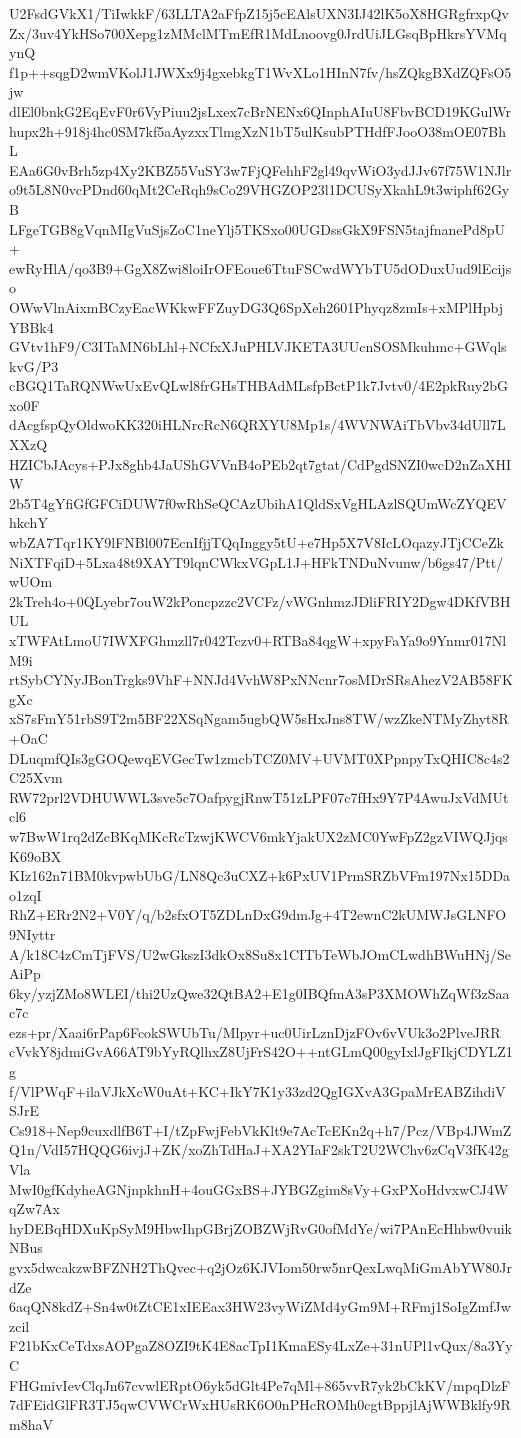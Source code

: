 U2FsdGVkX1/TiIwkkF/63LLTA2aFfpZ15j5cEAlsUXN3IJ42lK5oX8HGRgfrxpQv
Zx/3uv4YkHSo700Xepg1zMMclMTmEfR1MdLnoovg0JrdUiJLGsqBpHkrsYVMqynQ
f1p++sqgD2wmVKolJ1JWXx9j4gxebkgT1WvXLo1HInN7fv/hsZQkgBXdZQFsO5jw
dlEl0bnkG2EqEvF0r6VyPiuu2jsLxex7cBrNENx6QInphAIuU8FbvBCD19KGulWr
hupx2h+918j4hc0SM7kf5aAyzxxTlmgXzN1bT5ulKsubPTHdfFJooO38mOE07BhL
EAa6G0vBrh5zp4Xy2KBZ55VuSY3w7FjQFehhF2gl49qvWiO3ydJJv67f75W1NJlr
o9t5L8N0vcPDnd60qMt2CeRqh9sCo29VHGZOP23l1DCUSyXkahL9t3wiphf62GyB
LFgeTGB8gVqnMIgVuSjsZoC1neYlj5TKSxo00UGDssGkX9FSN5tajfnanePd8pU+
ewRyHlA/qo3B9+GgX8Zwi8loiIrOFEoue6TtuFSCwdWYbTU5dODuxUud9lEcijso
OWwVlnAixmBCzyEacWKkwFFZuyDG3Q6SpXeh2601Phyqz8zmIs+xMPlHpbjYBBk4
GVtv1hF9/C3ITaMN6bLhl+NCfxXJuPHLVJKETA3UUcnSOSMkuhmc+GWqlskvG/P3
cBGQ1TaRQNWwUxEvQLwl8frGHsTHBAdMLsfpBctP1k7Jvtv0/4E2pkRuy2bGxo0F
dAcgfspQyOldwoKK320iHLNrcRcN6QRXYU8Mp1s/4WVNWAiTbVbv34dUll7LXXzQ
HZICbJAcys+PJx8ghb4JaUShGVVnB4oPEb2qt7gtat/CdPgdSNZI0wcD2nZaXHIW
2b5T4gYfiGfGFCiDUW7f0wRhSeQCAzUbihA1QldSxVgHLAzlSQUmWcZYQEVhkchY
wbZA7Tqr1KY9lFNBl007EcnIfjjTQqInggy5tU+e7Hp5X7V8IcLOqazyJTjCCeZk
NiXTFqiD+5Lxa48t9XAYT9lqnCWkxVGpL1J+HFkTNDuNvunw/b6gs47/Ptt/wUOm
2kTreh4o+0QLyebr7ouW2kPoncpzzc2VCFz/vWGnhmzJDliFRIY2Dgw4DKfVBHUL
xTWFAtLmoU7IWXFGhmzll7r042Tczv0+RTBa84qgW+xpyFaYa9o9Ynmr017NlM9i
rtSybCYNyJBonTrgks9VhF+NNJd4VvhW8PxNNcnr7osMDrSRsAhezV2AB58FKgXc
xS7sFmY51rbS9T2m5BF22XSqNgam5ugbQW5sHxJns8TW/wzZkeNTMyZhyt8R+OaC
DLuqmfQIs3gGOQewqEVGecTw1zmcbTCZ0MV+UVMT0XPpnpyTxQHIC8c4s2C25Xvm
RW72prl2VDHUWWL3sve5c7OafpygjRnwT51zLPF07c7fHx9Y7P4AwuJxVdMUtcl6
w7BwW1rq2dZcBKqMKcRcTzwjKWCV6mkYjakUX2zMC0YwFpZ2gzVIWQJjqsK69oBX
KIz162n71BM0kvpwbUbG/LN8Qc3uCXZ+k6PxUV1PrmSRZbVFm197Nx15DDao1zqI
RhZ+ERr2N2+V0Y/q/b2sfxOT5ZDLnDxG9dmJg+4T2ewnC2kUMWJsGLNFO9NIyttr
A/k18C4zCmTjFVS/U2wGkszI3dkOx8Su8x1CITbTeWbJOmCLwdhBWuHNj/SeAiPp
6ky/yzjZMo8WLEI/thi2UzQwe32QtBA2+E1g0IBQfmA3sP3XMOWhZqWf3zSaac7c
ezs+pr/Xaai6rPap6FcokSWUbTu/Mlpyr+uc0UirLznDjzFOv6vVUk3o2PlveJRR
cVvkY8jdmiGvA66AT9bYyRQlhxZ8UjFrS42O++ntGLmQ00gyIxlJgFIkjCDYLZ1g
f/VlPWqF+ilaVJkXcW0uAt+KC+IkY7K1y33zd2QgIGXvA3GpaMrEABZihdiVSJrE
Cs918+Nep9cuxdlfB6T+I/tZpFwjFebVkKlt9e7AcTcEKn2q+h7/Pcz/VBp4JWmZ
Q1n/VdI57HQQG6ivjJ+ZK/xoZhTdHaJ+XA2YIaF2skT2U2WChv6zCqV3fK42gVla
MwI0gfKdyheAGNjnpkhnH+4ouGGxBS+JYBGZgim8sVy+GxPXoHdvxwCJ4WqZw7Ax
hyDEBqHDXuKpSyM9HbwIhpGBrjZOBZWjRvG0ofMdYe/wi7PAnEcHhbw0vuikNBus
gvx5dwcakzwBFZNH2ThQvec+q2jOz6KJVIom50rw5nrQexLwqMiGmAbYW80JrdZe
6aqQN8kdZ+Sn4w0tZtCE1xIEEax3HW23vyWiZMd4yGm9M+RFmj1SoIgZmfJwzcil
F21bKxCeTdxsAOPgaZ8OZI9tK4E8acTpI1KmaESy4LxZe+31nUPl1vQux/8a3YyC
FHGmivIevClqJn67cvwlERptO6yk5dGlt4Pe7qMl+865vvR7yk2bCkKV/mpqDlzF
7dFEidGlFR3TJ5qwCVWCrWxHUsRK6O0nPHcROMh0cgtBppjlAjWWBklfy9Rm8haV
